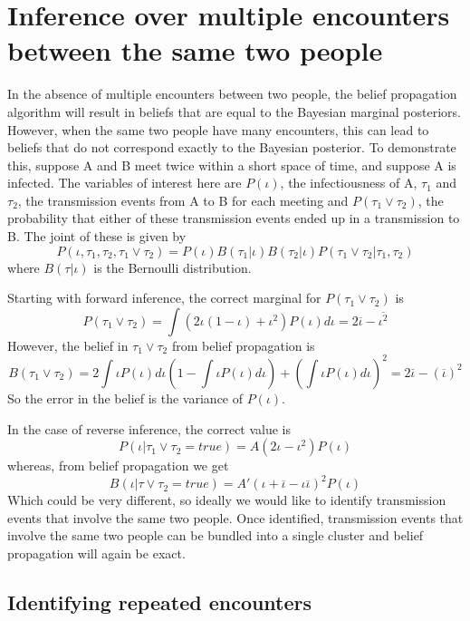 \documentclass{article}
\begin{document}
\section{Inference over multiple encounters between the same two people}
In the absence of multiple encounters between two people, the belief propagation algorithm will result in beliefs that are equal to the Bayesian marginal posteriors. However, when the same two people have many encounters, this can lead to beliefs that do not correspond exactly to the Bayesian posterior. To demonstrate this, suppose A and B meet twice within a short space of time, and suppose A is infected. The variables of interest here are $P(\iota)$, the infectiousness of A, $\tau_1$ and $\tau_2$, the transmission events from A to B for each meeting and  $P(\tau_1 \vee \tau_2)$, the probability that either of these transmission events ended up in a transmission to B. The joint of these is given by
\[
P(\iota, \tau_1, \tau_2, \tau_1 \vee \tau_2) = P(\iota)B(\tau_1|\iota)B(\tau_2|\iota)P(\tau_1 \vee \tau_2|\tau_1,\tau_2)
\]
where $B(\tau|\iota)$ is the Bernoulli distribution.

Starting with forward inference, the correct marginal for $P(\tau_1 \vee \tau_2)$ is
\[
P(\tau_1 \vee \tau_2) = \int \left(2\iota(1-\iota) + \iota^2\right) P(\iota) d\iota = 2\overline{\iota} -  \overline{\iota^2} 
\]
However, the belief in $\tau_1 \vee \tau_2$ from belief propagation is
\[
B(\tau_1 \vee \tau_2) = 2\int \iota P(\iota)d\iota\left(1-\int \iota P(\iota)d\iota\right) + \left(\int \iota P(\iota)d\iota\right)^2 = 2\overline{\iota} - \left(\overline{\iota}\right)^2
\]
So the error in the belief is the variance of $P(\iota)$.

In the case of reverse inference, the correct value is
\[
P(\iota | \tau_1 \vee \tau_2 = true) = A\left(2\iota - \iota^2\right)P(\iota)
\]
whereas, from belief propagation we get
\[
B(\iota | \tau \vee \tau_2 = true) = A' (\iota + \overline{\iota}-\iota\overline{\iota})^2P(\iota)
\]
Which could be very different, so ideally we would like to identify transmission events that involve the same two people. Once identified, transmission events that involve the same two people can be bundled into a single cluster and belief propagation will again be exact.

\subsection{Identifying repeated encounters}
\end{document}
